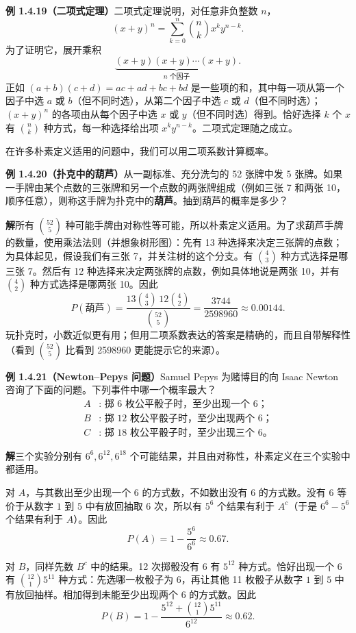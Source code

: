 \documentclass[UTF8, 12pt, fontset=fandol, oneside]{ctexart}
\begin{document}
\noindent\textbf{例 1.4.19（二项式定理）}\quad 二项式定理说明，对任意非负整数 $n$，
\[
  (x+y)^n=\sum_{k=0}^n \binom{n}{k}x^k y^{n-k}.
\]
为了证明它，展开乘积
\[
  \underbrace{(x+y)(x+y)\cdots(x+y)}_{n\text{ 个因子}}.
\]
正如 $(a+b)(c+d)=ac+ad+bc+bd$ 是一些项的和，其中每一项从第一个因子中选 $a$ 或 $b$（但不同时选），从第二个因子中选 $c$ 或 $d$（但不同时选）；$(x+y)^n$ 的各项由从每个因子中选 $x$ 或 $y$（但不同时选）得到。恰好选择 $k$ 个 $x$ 有 $\binom{n}{k}$ 种方式，每一种选择给出项 $x^k y^{n-k}$。二项式定理随之成立。

在许多朴素定义适用的问题中，我们可以用二项系数计算概率。

\noindent\textbf{例 1.4.20（扑克中的葫芦）}\quad 从一副标准、充分洗匀的 52 张牌中发 5 张牌。如果一手牌由某个点数的三张牌和另一个点数的两张牌组成（例如三张 7 和两张 10，顺序任意），则称这手牌为扑克中的\textbf{葫芦}。抽到葫芦的概率是多少？

\noindent\textbf{解}\quad 所有 $\binom{52}{5}$ 种可能手牌由对称性等可能，所以朴素定义适用。为了求葫芦手牌的数量，使用乘法法则（并想象树形图）：先有 13 种选择来决定三张牌的点数；为具体起见，假设我们有三张 7，并关注树的这个分支。有 $\binom43$ 种方式选择是哪三张 7。然后有 12 种选择来决定两张牌的点数，例如具体地说是两张 10，并有 $\binom42$ 种方式选择是哪两张 10。因此
\[
  P(\text{葫芦})
  =\frac{13\binom43\,12\binom42}{\binom{52}{5}}
  =\frac{3744}{2598960}\approx 0.00144.
\]
玩扑克时，小数近似更有用；但用二项系数表达的答案是精确的，而且自带解释性（看到 $\binom{52}{5}$ 比看到 2598960 更能提示它的来源）。

\noindent\textbf{例 1.4.21（Newton--Pepys 问题）}\quad Samuel Pepys 为赌博目的向 Isaac Newton 咨询了下面的问题。下列事件中哪一个概率最大？
\[
\begin{aligned}
A&:\text{ 掷 6 枚公平骰子时，至少出现一个 6；}\\
B&:\text{ 掷 12 枚公平骰子时，至少出现两个 6；}\\
C&:\text{ 掷 18 枚公平骰子时，至少出现三个 6。}
\end{aligned}
\]

\noindent\textbf{解}\quad 三个实验分别有 $6^6,6^{12},6^{18}$ 个可能结果，并且由对称性，朴素定义在三个实验中都适用。

对 $A$，与其数出至少出现一个 6 的方式数，不如数出没有 6 的方式数。没有 6 等价于从数字 $1$ 到 $5$ 中有放回抽取 6 次，所以有 $5^6$ 个结果有利于 $A^c$（于是 $6^6-5^6$ 个结果有利于 $A$）。因此
\[
  P(A)=1-\frac{5^6}{6^6}\approx 0.67.
\]

对 $B$，同样先数 $B^c$ 中的结果。12 次掷骰没有 6 有 $5^{12}$ 种方式。恰好出现一个 6 有 $\binom{12}{1}5^{11}$ 种方式：先选哪一枚骰子为 6，再让其他 11 枚骰子从数字 $1$ 到 $5$ 中有放回抽样。相加得到未能至少出现两个 6 的方式数。因此
\[
  P(B)=1-\frac{5^{12}+\binom{12}{1}5^{11}}{6^{12}}\approx 0.62.
\]
\end{document}

